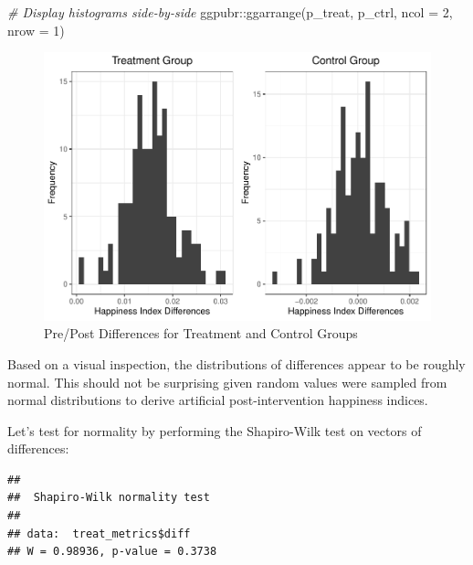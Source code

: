 \documentclass[
]{book}
\newenvironment{Shaded}{\begin{snugshade}}{\end{snugshade}}
\newcommand{\AttributeTok}[1]{\textcolor[rgb]{0.77,0.63,0.00}{#1}}
\newcommand{\CommentTok}[1]{\textcolor[rgb]{0.56,0.35,0.01}{\textit{#1}}}
\newcommand{\DecValTok}[1]{\textcolor[rgb]{0.00,0.00,0.81}{#1}}
\newcommand{\FunctionTok}[1]{\textcolor[rgb]{0.00,0.00,0.00}{#1}}
\newcommand{\NormalTok}[1]{#1}
\newcommand{\SpecialCharTok}[1]{\textcolor[rgb]{0.00,0.00,0.00}{#1}}
\begin{document}
\begin{Shaded}
\begin{Highlighting}[]
\CommentTok{\# Display histograms side{-}by{-}side}
\NormalTok{ggpubr}\SpecialCharTok{::}\FunctionTok{ggarrange}\NormalTok{(p\_treat, p\_ctrl, }\AttributeTok{ncol =} \DecValTok{2}\NormalTok{, }\AttributeTok{nrow =} \DecValTok{1}\NormalTok{)}
\end{Highlighting}
\end{Shaded}

\begin{figure}

{\centering \includegraphics{People_Analytics_Lifecycle_files/figure-latex/pre-post-diff-1} 

}

\caption{Pre/Post Differences for Treatment and Control Groups}\label{fig:pre-post-diff}
\end{figure}

Based on a visual inspection, the distributions of differences appear to be roughly normal. This should not be surprising given random values were sampled from normal distributions to derive artificial post-intervention happiness indices.

Let's test for normality by performing the Shapiro-Wilk test on vectors of differences:

\begin{Shaded}
\end{Shaded}

\begin{verbatim}
## 
##  Shapiro-Wilk normality test
## 
## data:  treat_metrics$diff
## W = 0.98936, p-value = 0.3738
\end{verbatim}
\end{document}
